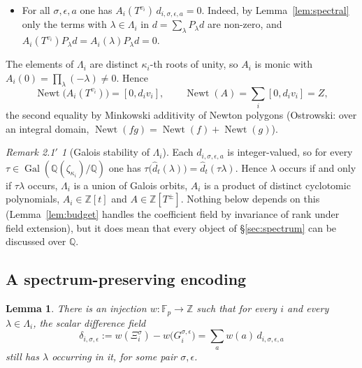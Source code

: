 \documentclass[11pt,reqno]{amsart}
\theoremstyle{plain}
\newtheorem{lem}[thm]{Lemma}
\theoremstyle{definition}
\theoremstyle{remark}
\theoremstyle{plain}
\theoremstyle{remark}
\newtheorem*{remgalois}{Remark 2.1$'$}
\theoremstyle{definition}
\numberwithin{equation}{section}
\DeclareMathOperator{\Newt}{Newt}
\DeclareMathOperator{\Gal}{Gal}
\newcommand{\Z}{\mathbb{Z}}
\newcommand{\Q}{\mathbb{Q}}
\newcommand{\Fp}{\mathbb{F}_p}
\begin{document}
\begin{itemize}
\item[\textup{(P3)}] For all $\sigma,\epsilon,a$ one has
      $A_i(T^{v_i})\,d_{i,\sigma,\epsilon,a}=0$.  Indeed, by
      Lemma~\ref{lem:spectral} only the terms with $\lambda\in\Lambda_i$ in
      $d=\sum_\lambda P_\lambda d$ are non-zero, and
      $A_i(T^{v_i})P_\lambda d=A_i(\lambda)P_\lambda d=0$.
\end{itemize}

The elements of $\Lambda_i$ are distinct $\kappa_i$-th roots of unity, so $A_i$
is monic with $A_i(0)=\prod_{\lambda}(-\lambda)\ne0$.  Hence
\begin{equation}
\Newt\bigl(A_i(T^{v_i})\bigr)=[0,d_iv_i],\qquad
\Newt(A)=\sum_i[0,d_iv_i]=Z, \label{eq:NewtA}
\end{equation}
the second equality by Minkowski additivity of Newton polygons (Ostrowski: over
an integral domain, $\Newt(fg)=\Newt(f)+\Newt(g)$).

\begin{remgalois}[Galois stability of $\Lambda_i$]
Each $d_{i,\sigma,\epsilon,a}$ is integer-valued, so for every
$\tau\in\Gal(\Q(\zeta_{\kappa_i})/\Q)$ one has
$\tau\bigl(\widehat d_t(\lambda)\bigr)=\widehat d_t(\tau\lambda)$.  Hence
$\lambda$ occurs if and only if $\tau\lambda$ occurs, $\Lambda_i$ is a union of
Galois orbits, $A_i$ is a product of distinct cyclotomic polynomials,
$A_i\in\Z[t]$ and $A\in\Z[T^{\pm}]$.  Nothing below depends on this
(Lemma~\ref{lem:budget} handles the coefficient field by invariance of rank
under field extension), but it does mean that every object of
\S\ref{sec:spectrum} can be discussed over $\Q$.
\end{remgalois}

\subsection{A spectrum-preserving encoding}\label{ssec:encoding}

\begin{lem}\label{lem:encoding}
There is an injection $w\colon\Fp\to\Z$ such that for every $i$ and every
$\lambda\in\Lambda_i$, the scalar difference field
\[\delta_{i,\sigma,\epsilon}:=w(\Xi_i^\sigma)-w\bigl(G_i^{\sigma,\epsilon}\bigr)
  =\sum_aw(a)\,d_{i,\sigma,\epsilon,a}\]
still has $\lambda$ occurring in it, for some pair $\sigma,\epsilon$.
\end{lem}
\end{document}
